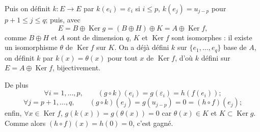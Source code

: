 \begin{enumerate}[label=\arabic*.,leftmargin=2.2em,itemsep=1.1em]
Puis on définit $k:E\to E$ par $k(e_i)=\varepsilon_i$ si $i\le p$, $k(e_j)=u_{j-p}$ pour $p+1\le j\le q$; puis, avec
\[
E=B\oplus\operatorname{Ker} g=(B\oplus H)\oplus K=A\oplus\operatorname{Ker} f,
\]
comme $B\oplus H$ et $A$ sont de dimension $q$, $K$ et $\operatorname{Ker} f$ sont isomorphes : il existe un isomorphisme $\theta$ de $\operatorname{Ker} f$ sur $K$. On a déjà défini $k$ sur $\{e_1,\ldots,e_q\}$ base de $A$, on définit $k$ par $k(x)=\theta(x)$ pour tout $x$ de $\operatorname{Ker} f$, d'où $k$ défini sur $E=A\oplus\operatorname{Ker} f$, bijectivement.

De plus
\[
\forall i=1,\ldots,p,\qquad (g\circ k)(e_i)=g(\varepsilon_i)=h(f(e_i));
\]
\[
\forall j=p+1,\ldots,q,\qquad (g\circ k)(e_j)=g(u_{j-p})=0=(h\circ f)(e_j);
\]
enfin, $\forall x\in\operatorname{Ker} f$, $g(k(x))=g(\theta(x))=0$ car $\theta(x)\in K$ et $K\subset\operatorname{Ker} g$. Comme alors $(h\circ f)(x)=h(0)=0$, c'est gagné.

\end{enumerate}
